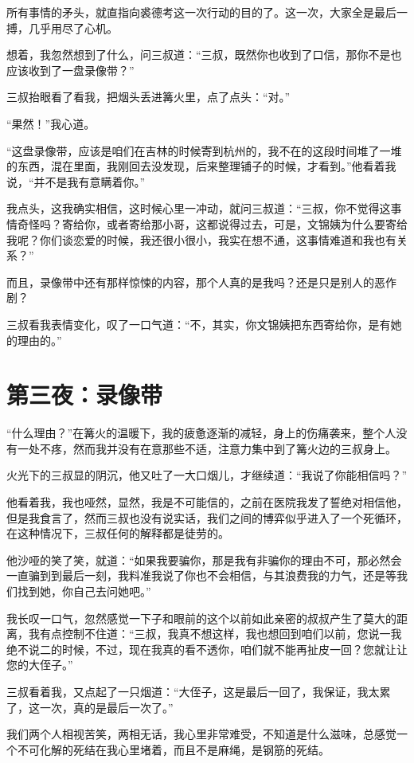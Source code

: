 所有事情的矛头，就直指向裘德考这一次行动的目的了。这一次，大家全是最后一搏，几乎用尽了心机。

想着，我忽然想到了什么，问三叔道：“三叔，既然你也收到了口信，那你不是也应该收到了一盘录像带？”

三叔抬眼看了看我，把烟头丢进篝火里，点了点头：“对。”

“果然！”我心道。

“这盘录像带，应该是咱们在吉林的时候寄到杭州的，我不在的这段时间堆了一堆的东西，混在里面，我刚回去没发现，后来整理铺子的时候，才看到。”他看着我说，“并不是我有意瞒着你。”

我点头，这我确实相信，这时候心里一冲动，就问三叔道：“三叔，你不觉得这事情奇怪吗？寄给你，或者寄给那小哥，这都说得过去，可是，文锦姨为什么要寄给我呢？你们谈恋爱的时候，我还很小很小，我实在想不通，这事情难道和我也有关系？”

而且，录像带中还有那样惊悚的内容，那个人真的是我吗？还是只是别人的恶作剧？

三叔看我表情变化，叹了一口气道：“不，其实，你文锦姨把东西寄给你，是有她的理由的。”

\chapter{第三夜：录像带}

“什么理由？”在篝火的温暖下，我的疲惫逐渐的减轻，身上的伤痛袭来，整个人没有一处不疼，然而我并没有在意那些不适，注意力集中到了篝火边的三叔身上。

火光下的三叔显的阴沉，他又吐了一大口烟儿，才继续道：“我说了你能相信吗？”

他看着我，我也哑然，显然，我是不可能信的，之前在医院我发了誓绝对相信他，但是我食言了，然而三叔也没有说实话，我们之间的博弈似乎进入了一个死循环，在这种情况下，三叔任何的解释都是徒劳的。

他沙哑的笑了笑，就道：“如果我要骗你，那是我有非骗你的理由不可，那必然会一直骗到到最后一刻，我料准我说了你也不会相信，与其浪费我的力气，还是等我们找到她，你自己去问她吧。”

我长叹一口气，忽然感觉一下子和眼前的这个以前如此亲密的叔叔产生了莫大的距离，我有点控制不住道：“三叔，我真不想这样，我也想回到咱们以前，您说一我绝不说二的时候，不过，现在我真的看不透你，咱们就不能再扯皮一回？您就让让您的大侄子。”

三叔看着我，又点起了一只烟道：“大侄子，这是最后一回了，我保证，我太累了，这一次，真的是最后一次了。”

我们两个人相视苦笑，两相无话，我心里非常难受，不知道是什么滋味，总感觉一个不可化解的死结在我心里堵着，而且不是麻绳，是钢筋的死结。

